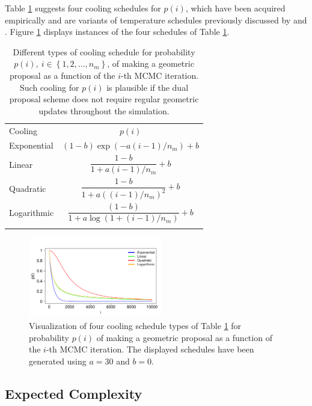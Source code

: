 \documentclass[twoside,11pt]{article}
\begin{document}
Table \ref{tab:cooling_schedules} suggests four cooling schedules for $p(i)$, which have been acquired empirically and are 
variants of temperature schedules previously discussed by \cite{haj__coo} and \cite{nou_and__aco}.
Figure \ref{fig:cooling_schedules} displays instances of the four schedules of Table \ref{tab:cooling_schedules}.

\begin{table}[t]
\centering
\begin{tabular}{l|c}
\hline\noalign{\smallskip}
Cooling & $p(i)$\\
\noalign{\smallskip}\hline\noalign{\smallskip}
Exponential & $(1-b)\exp(-a(i-1)/n_m)+b$\\
\noalign{\smallskip}\hline\noalign{\smallskip}
Linear & $\dfrac{1-b}{1+a(i-1)/n_m}+b$\\
\noalign{\smallskip}\hline\noalign{\smallskip}
Quadratic & $\dfrac{1-b}{1+a((i-1)/n_m)^2}+b$\\
\noalign{\smallskip}\hline\noalign{\smallskip}
Logarithmic & $\dfrac{(1-b)}{1+a\log(1+(i-1)/n_m)}+b$\\
\noalign{\smallskip}\hline
\end{tabular}
\caption{
Different types of cooling schedule for probability $p(i),~i\in\left\{1,2,\dots,n_m\right\}$, of making a geometric proposal 
as a function of the $i$-th MCMC iteration. Such cooling for $p(i)$ is plausible if the dual proposal scheme does not 
require regular geometric updates throughout the simulation.
}
\label{tab:cooling_schedules}
\end{table}

\begin{figure}[t]
\centering
\includegraphics[width=2.3in]{cooling_schedules.pdf}
\caption{
Visualization of four cooling schedule types of Table \ref{tab:cooling_schedules} for probability $p(i)$ of making a 
geometric proposal as a function of the $i$-th MCMC iteration. The displayed schedules have been generated using $a=30$ and 
$b=0$.
}
\label{fig:cooling_schedules}
\end{figure}

\subsection{Expected Complexity}
\label{Expected Complexity}
\end{document}
